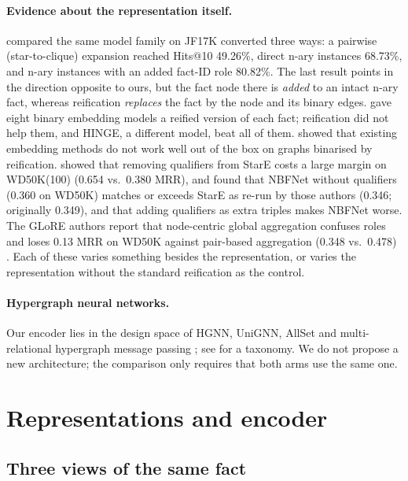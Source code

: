 \documentclass[11pt,a4paper]{article}
\begin{document}
\paragraph{Evidence about the representation itself.}
\citet{wen2016mtransh} compared the same model family on JF17K converted three ways: a pairwise (star-to-clique) expansion reached Hits@10 49.26\%, direct n-ary instances 68.73\%, and n-ary instances with an added fact-ID role 80.82\%. The last result points in the direction opposite to ours, but the fact node there is \emph{added} to an intact n-ary fact, whereas reification \emph{replaces} the fact by the node and its binary edges. \citet{rosso2020hinge} gave eight binary embedding models a reified version of each fact; reification did not help them, and HINGE, a different model, beat all of them. \citet{fatemi2020hype} showed that existing embedding methods do not work well out of the box on graphs binarised by reification. \citet{galkin2020stare} showed that removing qualifiers from StarE costs a large margin on WD50K(100) (0.654 vs.\ 0.380 MRR), and \citet{wang2025understanding} found that NBFNet \citep{zhu2021nbfnet} without qualifiers (0.360 on WD50K) matches or exceeds StarE as re-run by those authors (0.346; originally 0.349), and that adding qualifiers as extra triples makes NBFNet worse. The GLoRE authors report that node-centric global aggregation confuses roles and loses 0.13 MRR on WD50K against pair-based aggregation (0.348 vs.\ 0.478) \citep{ji2026glore}. Each of these varies something besides the representation, or varies the representation without the standard reification as the control.

\paragraph{Hypergraph neural networks.}
Our encoder lies in the design space of HGNN, UniGNN, AllSet and multi-relational hypergraph message passing \citep{feng2019hgnn,huang2021unignn,chien2022allset,yadati2020gmpnn}; see \citet{kim2024hgnnsurvey} for a taxonomy. We do not propose a new architecture; the comparison only requires that both arms use the same one.

\section{Representations and encoder}

\subsection{Three views of the same fact}
\end{document}
